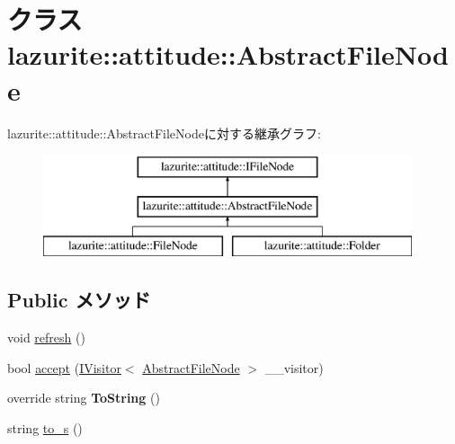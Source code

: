 \hypertarget{classlazurite_1_1attitude_1_1_abstract_file_node}{
\section{クラス lazurite::attitude::AbstractFileNode}
\label{classlazurite_1_1attitude_1_1_abstract_file_node}
}
lazurite::attitude::AbstractFileNodeに対する継承グラフ:\begin{figure}[H]
\begin{center}
\leavevmode
\includegraphics[height=3cm]{classlazurite_1_1attitude_1_1_abstract_file_node}
\end{center}
\end{figure}
\subsection*{Public メソッド}
\begin{DoxyCompactItemize}
\item 
void \hyperlink{classlazurite_1_1attitude_1_1_abstract_file_node_a78558f5a5aa0b91f8f084fcada9c9e75}{refresh} ()
\item 
bool \hyperlink{classlazurite_1_1attitude_1_1_abstract_file_node_a7360df3ccc00eedf89304d32666f6fa6}{accept} (\hyperlink{interfacelazurite_1_1pattern_1_1basics_1_1_i_visitor}{IVisitor}$<$ \hyperlink{classlazurite_1_1attitude_1_1_abstract_file_node}{AbstractFileNode} $>$ \_\-\_\-visitor)
\item 
\hypertarget{classlazurite_1_1attitude_1_1_abstract_file_node_a16846dca13a7164c141846a36037c134}{
override string {\bfseries ToString} ()}
\label{classlazurite_1_1attitude_1_1_abstract_file_node_a16846dca13a7164c141846a36037c134}

\item 
string \hyperlink{classlazurite_1_1attitude_1_1_abstract_file_node_a6a973ebb89790b0b5d2f149c25433b25}{to\_\-s} ()
\end{DoxyCompactItemize}
